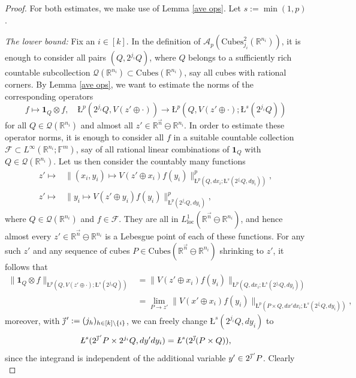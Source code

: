 \documentclass[11pt, reqno]{amsart}
\theoremstyle{definition}
\theoremstyle{remark}
\numberwithin{equation}{section}
\newcommand{\A}{\mathscr A}
\newcommand{\F}{\mathbb F}
\newcommand{\Fs}{\mathscr F}
\newcommand{\Qs}{\mathscr Q}
\newcommand{\R}{\mathbb R}
\newcommand{\vj}{\vec{\textit{\j}}}
\newcommand{\vjprime}{\vj\,{}'}
\newcommand{\vn}{\vec n}
\newcommand{\one}{\mathbf{1}}
\newcommand{\loc}{\mathrm{loc}}
\newcommand{\aveL}{\textit{\L}}
\newcommand{\Norm}[2]{\|#1\|_{#2}}
\newcommand{\Cubes}{\mathrm{Cubes}}
\begin{document}
\begin{proof}
For both estimates, we make use of Lemma \ref{ave ops}. Let $s:=\min(1,p)$.

\textit{The lower bound:} Fix an $i\in[k]$. In the definition of $\A_{p}(\Cubes^2_{j_i}(\R^{n_i}))$, it is enough to consider all pairs $(Q,2^{j_i}Q)$, where $Q$ belongs to a sufficiently rich countable subcollection $\Qs(\R^{n_i})\subset\Cubes(\R^{n_i})$, say all cubes with rational corners. By Lemma \ref{ave ops}, we want to estimate the norms of the corresponding operators
\begin{equation}\label{pvc1}
f\mapsto\one_Q\otimes f,\quad \aveL^p(2^{j_i}Q,V(z'\oplus\cdot))\to \aveL^p(Q,V(z'\oplus\cdot);\aveL^s(2^{j_i}Q))
\end{equation}
for all $Q\in\Qs(\R^{n_i})$ and almost all $z'\in\R^{\vn}\ominus\R^{n_i}$.
In order to estimate these operator norms, it is enough to consider
all $f$ in a suitable countable collection $\Fs\subset L^\infty(\R^{n_i};\F^m)$,
say of all rational linear combinations of $\one_Q$ with $Q\in\Qs(\R^{n_i})$.
Let us then consider the countably many functions
\begin{align*}
z'\mapsto &\Norm{(x_i,y_i)\mapsto V(z'\oplus x_i)f(y_i)}{\aveL^p(Q,dx_i;\aveL^s(2^{j_i}Q,dy_i))}^p, \\
z'\mapsto &\Norm{y_i\mapsto V(z'\oplus y_i)f(y_i)}{\aveL^p(2^{j_i}Q,dy_i)}^p,
\end{align*}
where $Q\in\Qs(\R^{n_i})$ and $f\in\Fs$. They are all in $L^1_{\loc}(\R^{\vn}\ominus\R^{n_i})$, and hence almost every $z'\in \R^{\vn}\ominus\R^{n_i}$ is a Lebesgue point of each of these functions. For any such $z'$ and any sequence of cubes $P\in\Cubes(\R^{\vn}\ominus\R^{n_i})$ shrinking to $z'$, it follows that
\begin{align*}
\Norm{\one_Q\otimes f}{\aveL^p(Q,V(z'\oplus\cdot);\aveL^s(2^{j_i}Q))}
&=\Norm{V(z'\oplus x_i)f(y_i)}{\aveL^p(Q,dx_i;\aveL^s(2^{j_i}Q,dy_i))} \\
&=\lim_{P\to z'} \Norm{V(x'\oplus x_i)f(y_i)}{\aveL^p(P\times Q,dx'dx_i;\aveL^s(2^{j_i}Q,dy_i))},
\end{align*}
moreover, with $\vjprime:=(j_h)_{h\in[k]\setminus\{i\}}$,
we can freely change $\aveL^s(2^{j_i}Q,dy_i)$ to
\begin{equation*}
  \aveL^s(2^{\vjprime}P\times 2^{j_i}Q,dy'dy_i)=\aveL^s(2^{\vj}(P\times Q)),
\end{equation*}
since the integrand is independent of the additional variable $y'\in 2^{\vjprime}P$.
Clearly
\begin{equation*}

\end{equation*}
\end{proof}
\end{document}
